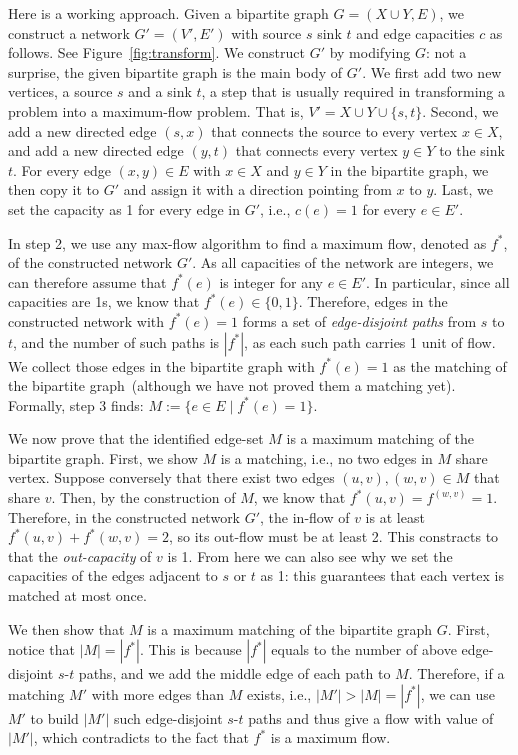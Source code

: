 Here is a working approach. Given a bipartite graph $G = (X\cup Y, E)$, we construct
a network $G' = (V', E')$ with source $s$ sink $t$ and edge capacities $c$ as follows.
See Figure~\ref{fig:transform}.
We construct $G'$ by modifying $G$: not a surprise, the given bipartite graph is the main
body of $G'$.
We first add two new vertices, a source $s$ and a sink $t$, a step that is usually required
in transforming a problem into a maximum-flow problem.
That is, $V' = X\cup Y\cup \{s, t\}$.
Second, we add a new directed edge $(s,x)$ that connects the source to every vertex $x\in X$, 
and add a new directed edge $(y,t)$ that connects every vertex $y\in Y$ to the sink $t$. 
For every edge $(x,y)\in E$ with $x\in X$ and $y\in Y$ in the bipartite graph,
we then copy it to $G'$ and assign it with a direction pointing from $x$ to $y$.
Last, we set the capacity as 1 for every edge in $G'$, i.e., $c(e) = 1$ for every $e\in E'$.


In step 2, we use any max-flow algorithm to find a maximum flow, denoted as $f^*$,
of the constructed network $G'$. As all capacities of the network are integers,
we can therefore assume that $f^*(e)$ is integer for any $e\in E'$.
In particular, since all capacities are 1s, we know that $f^*(e) \in \{0, 1\}$.
Therefore, edges in the constructed network with $f^*(e) = 1$ forms a set of \emph{edge-disjoint paths}
from $s$ to $t$, and the number of such paths is $|f^*|$, as each such path
carries 1 unit of flow. We collect those edges in the bipartite graph with $f^*(e) = 1$
as the matching of the bipartite graph~(although we have not proved them a matching yet).
Formally, step 3 finds: $M := \{e\in E\mid f^*(e) = 1\}$.


We now prove that the identified edge-set $M$ is a maximum matching of the bipartite graph.
First, we show $M$ is a matching, i.e., no two edges in $M$
share vertex. Suppose conversely that there exist two edges $(u,v), (w,v)\in M$ that share $v$.
Then, by the construction of $M$, we know that $f^*(u,v) = f^(w,v) = 1$.
Therefore, in the constructed network $G'$, the in-flow of $v$ is at least $f^*(u,v) + f^*(w,v) = 2$,
so its out-flow must be at least 2. This constracts to that the \emph{out-capacity} of $v$
is 1. From here we can also see why we set the capacities of the edges adjacent to $s$ or $t$
as 1: this guarantees that each vertex is matched at most once.

We then show that $M$ is a maximum matching of the bipartite graph $G$.
First, notice that $|M| = |f^*|$. This is because $|f^*|$ equals to the
number of above edge-disjoint $s$-$t$ paths, and we add the middle
edge of each path to $M$.  Therefore, if a matching $M'$ with more edges than $M$ exists, i.e., $|M'| > |M| = |f^*|$,
we can use $M'$ to build $|M'|$ such edge-disjoint $s$-$t$ paths and thus 
give a flow with value of $|M'|$, which contradicts to the fact that $f^*$ is a maximum flow.

